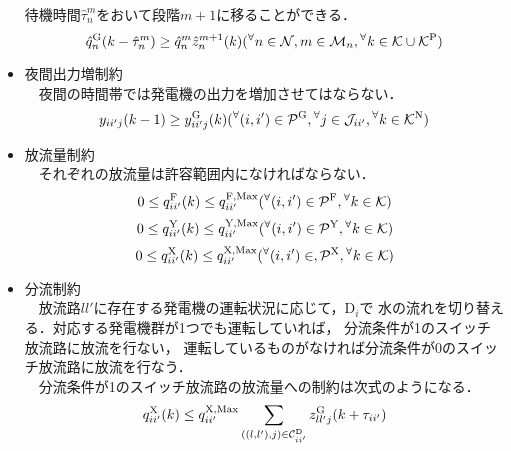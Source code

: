 \begin{itemize}
		待機時間$\hat{\tau}^{m}_{n}$をおいて段階$m+1$に移ることができる．
%
		\begin{equation}
			\label{all4}
			\hat q^{\rm G}_{n} ( k - \hat{\tau}^{m}_{n} )%
			\geq %
			\hat{q}^{m}_{n} \hat{z}^{m+1}_{n} ( k )
			\hfill ({}^{\forall} n \in \mathcal{N} , m \in \mathcal{M}_{n} , 
			{}^{\forall} k \in \mathcal{K} \cup \mathcal{K}^{\rm P}) 
		\end{equation}	
%
	\item 
		夜間出力増制約 \\
		　夜間の時間帯では発電機の出力を増加させてはならない．
%
		\begin{equation}
			y_{ii'j}(k-1) \geq y^{\rm G}_{ii'j}(k) %
			\hfill ({}^\forall(i,i') \in \mathcal{P}^{\rm G} , {}^{\forall} j \in \mathcal{J}_{ii'} , %
			{}^{\forall}k \in \mathcal{K}^{\rm N})
		\end{equation}	 
%
	\item 放流量制約 \\
	　それぞれの放流量は許容範囲内になければならない．			
		\begin{equation}
			0 \leq q^{\rm F}_{ii'}(k) \leq q_{ii'}^{\mathrm{F,Max}} 
			\hfill ({}^\forall(i,i') \in \mathcal{P}^{\rm F} , {}^{\forall} k \in \mathcal{K})
		\end{equation}	
		\begin{equation}
			0 \leq q^{\rm Y}_{ii'} (k) \leq q^{\rm {Y,Max}}_{ii'}
			\hfill ({}^\forall(i,i') \in \mathcal{P}^{\rm Y} , {}^{\forall} k \in \mathcal{K})
		\end{equation}
		\begin{equation}
			0 \leq q^{\rm X}_{ii'} (k) \leq q^{\rm {X,Max}}_{ii'} \\%
			\hfill ({}^\forall(i,i') \in , \mathcal{P}^{\rm X}  , {}^{\forall} k \in \mathcal{K}) 
		\end{equation}
%
	\item
		分流制約 \\
		　放流路$ll'$に存在する発電機の運転状況に応じて，$\mathrm D_{i}$で%
		水の流れを切り替える．対応する発電機群が1つでも運転していれば， %
		分流条件が1のスイッチ放流路に放流を行ない，%
		運転しているものがなければ分流条件が0のスイッチ放流路に放流を行なう．\\
		　分流条件が1のスイッチ放流路の放流量への制約は次式のようになる．
%
		\begin{equation}
			q^{\rm X}_{ii'} (k) \leq %
			q_{ii'}^{\rm X,Max} \sum_{ (( l , l' ) , j ) \in \mathcal C_{ii'}^{\rm D}} %
			{z}^{\rm G}_{ll'j} (k+ \tau_{ii'})
		\end{equation}

\end{itemize}
